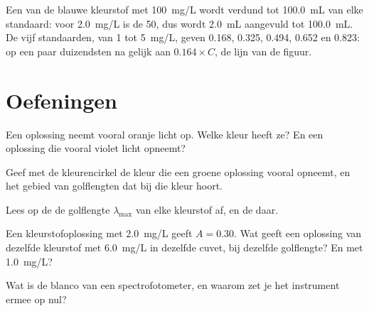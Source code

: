 \begin{example}\label{ex:g11:absorbance:standards}
Een  van de blauwe kleurstof met \qty{100}{mg/L} wordt
verdund tot \qty{100.0}{mL} van elke standaard: voor \qty{2.0}{mg/L} is
de  50, dus wordt \qty{2.0}{mL}  aangevuld
tot \qty{100.0}{mL}. De vijf standaarden, van 1 tot \qty{5}{mg/L}, geven
0.168, 0.325, 0.494, 0.652 en 0.823: op een paar duizendsten na gelijk
aan $0.164 \times C$, de lijn van de figuur.
\end{example}

\section{Oefeningen}

\begin{exercise}[$\star$]\label{exo:g11:absorbance:1}
Een oplossing neemt vooral oranje licht op. Welke kleur heeft ze? En een
oplossing die vooral violet licht opneemt?
\end{exercise}

\begin{exercise}[$\star$]\label{exo:g11:absorbance:2}
Geef met de kleurencirkel de kleur die een groene oplossing vooral
opneemt, en het gebied van golflengten dat bij die kleur hoort.
\end{exercise}

\begin{exercise}[$\star$]\label{exo:g11:absorbance:3}
Lees op de  de golflengte $\lambda_{\max}$ van elke
kleurstof af, en de  daar.
\end{exercise}

\begin{exercise}[$\star$]\label{exo:g11:absorbance:4}
Een kleurstofoplossing met \qty{2.0}{mg/L} geeft $A = 0.30$. Wat geeft een
oplossing van dezelfde kleurstof met \qty{6.0}{mg/L} in dezelfde cuvet,
bij dezelfde golflengte? En met \qty{1.0}{mg/L}?
\end{exercise}

\begin{exercise}[$\star$]\label{exo:g11:absorbance:5}
Wat is de blanco van een spectrofotometer, en waarom zet je het
instrument ermee op nul?
\end{exercise}

